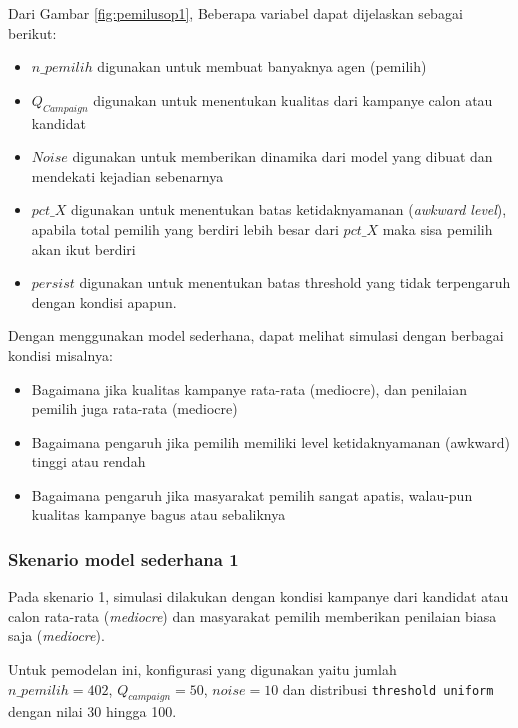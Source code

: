 Dari Gambar \ref{fig:pemilusop1}, Beberapa variabel dapat dijelaskan sebagai berikut:

\begin{itemize}
\item $n\_pemilih$ digunakan untuk membuat banyaknya agen (pemilih)

\item $Q_{Campaign}$ digunakan untuk menentukan kualitas dari kampanye calon atau kandidat

\item $Noise$ digunakan untuk memberikan dinamika dari model yang dibuat dan mendekati kejadian sebenarnya

\item $pct\_X$ digunakan untuk menentukan batas ketidaknyamanan (\textit{awkward level}), apabila total pemilih yang berdiri lebih besar dari $pct\_X$ maka sisa pemilih akan ikut berdiri

\item $persist$ digunakan untuk menentukan batas threshold yang tidak terpengaruh dengan kondisi apapun.
\end{itemize}

Dengan menggunakan model sederhana, dapat melihat simulasi dengan berbagai kondisi misalnya:

\begin{itemize}
\item Bagaimana jika kualitas kampanye rata-rata (mediocre), dan penilaian pemilih juga rata-rata (mediocre)

\item Bagaimana pengaruh jika pemilih memiliki level ketidaknyamanan (awkward) tinggi atau rendah

\item Bagaimana pengaruh jika masyarakat pemilih sangat apatis, walau-pun kualitas kampanye bagus atau sebaliknya
\end{itemize}

\subsubsection{Skenario model sederhana 1}

Pada skenario 1, simulasi dilakukan dengan kondisi kampanye dari kandidat atau calon rata-rata (\textit{mediocre}) dan masyarakat pemilih memberikan penilaian biasa saja (\textit{mediocre}).

Untuk pemodelan ini, konfigurasi yang digunakan yaitu jumlah\\ $n\_pemilih=402$, $Q_{campaign}=50$, $noise=10$ dan distribusi \texttt{threshold uniform} dengan nilai 30 hingga 100.

